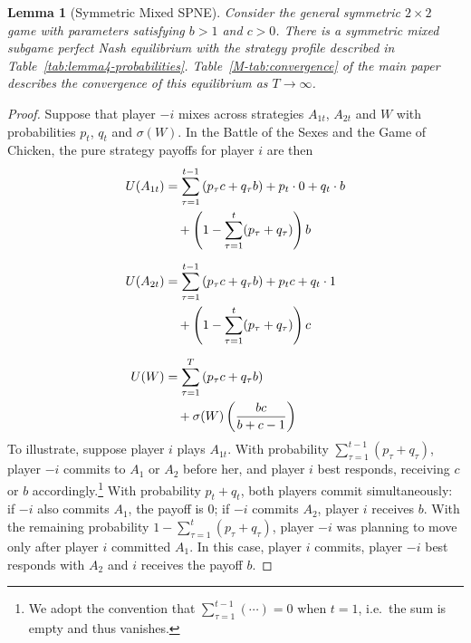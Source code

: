 \documentclass[letterpaper]{article}
\newcommand{\bparam}{b}
\newcommand{\cparam}{c}
\newtheorem{lemma}{Lemma}
\theoremstyle{definition}
\begin{document}
\begin{lemma}[Symmetric Mixed SPNE]\label{lem:equilibrium}
    Consider the general symmetric $2\times2$ game with parameters satisfying $\bparam>1$ and $\cparam>0$. There is a symmetric mixed subgame perfect Nash equilibrium with the strategy profile described in Table~\ref{tab:lemma4-probabilities}. Table~\ref{M-tab:convergence} of the main paper describes the convergence of this equilibrium as $T\to\infty$.
\end{lemma}
\begin{proof}
Suppose that player $-i$ mixes across strategies $A_{1t}$, $A_{2t}$ and $W$ with probabilities $p_t$, $q_t$ and $\sigma(W)$. In the Battle of the Sexes and the Game of Chicken, the pure strategy payoffs for player $i$ are then
\begin{align}
U(A_{1t})
&= \sum_{\tau=1}^{t-1}\left( p_\tau \cparam + q_\tau \bparam \right)
 + p_t \cdot 0 + q_t \cdot \bparam \notag\\
&\quad + \left(1 - \sum_{\tau=1}^{t}(p_\tau + q_\tau)\right) \bparam
\label{eq:U_A1t} \\[6pt]
U(A_{2t})
&= \sum_{\tau=1}^{t-1}\left( p_\tau \cparam + q_\tau \bparam \right)
 + p_t \cparam + q_t \cdot 1 \notag\\
&\quad + \left(1 - \sum_{\tau=1}^{t}(p_\tau + q_\tau) \right) \cparam
\label{eq:U_A2t} \\[6pt]
U(W)
&= \sum_{\tau=1}^{T} \left( p_\tau \cparam + q_\tau \bparam \right) \notag\\
&\quad + \sigma(W) \left( \frac{\bparam\cparam}{\bparam + \cparam - 1} \right)
\label{eq:U_W}
\end{align}
To illustrate, suppose player $i$ plays $A_{1t}$. With probability $\sum_{\tau=1}^{t-1}(p_\tau + q_\tau)$, player $-i$ commits to $A_1$ or $A_2$ before her, and player $i$ best responds, receiving $\cparam$ or $\bparam$ accordingly.\footnote{We adopt the convention that $\sum_{\tau=1}^{t-1} (\cdots) = 0$ when $t=1$, i.e.\ the sum is empty and thus vanishes.}
With probability $p_t + q_t$, both players commit simultaneously: if $-i$ also commits $A_1$, the payoff is $0$; if $-i$ commits $A_2$, player $i$ receives $\bparam$. With the remaining probability $1 - \sum_{\tau=1}^{t}(p_\tau + q_\tau)$, player $-i$ was planning to move only after player $i$ committed $A_1$. In this case, player $i$ commits, player $-i$ best responds with $A_2$ and $i$ receives the payoff $\bparam$.


\end{proof}
\end{document}
